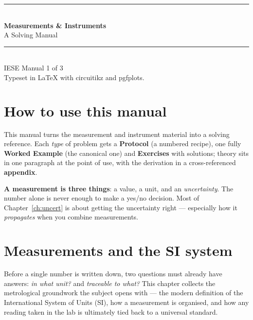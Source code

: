 \documentclass[11pt,a4paper,oneside]{book}
\begin{document}
\frontmatter

\begingroup
\thispagestyle{empty}\centering
\vspace*{2.2cm}
{\color{accent}\rule{\linewidth}{1.4pt}}\\[0.5cm]
{\Huge\bfseries\color{accent} Measurements \& Instruments}\\[0.35cm]
{\LARGE A Solving Manual}\\[0.4cm]
{\color{accent}\rule{\linewidth}{1.4pt}}\\[1.2cm]
{\large IESE Manual 1 of 3 }\\[1.6cm]
{\footnotesize Typeset in \LaTeX{} with circuitikz and pgfplots.}
\par\vspace*{\fill}
\endgroup
\clearpage

\chapter*{How to use this manual}

This manual turns the measurement and instrument material into a solving reference.
Each \emph{type} of problem gets a \textbf{Protocol} (a numbered recipe), one
fully \textbf{Worked Example} (the canonical one) and
\textbf{Exercises} with solutions; theory sits in one paragraph at the point of
use, with the derivation in a cross-referenced \textbf{appendix}.

\begin{keyidea}
\textbf{A measurement is three things}: a value, a unit, and an
\emph{uncertainty}. The number alone is never enough to make a yes/no decision.
Most of Chapter~\ref{ch:uncert} is about getting the uncertainty right ---
especially how it \emph{propagates} when you combine measurements.
\end{keyidea}

\tableofcontents
\clearpage
\mainmatter

\chapter{Measurements and the SI system}\label{ch:si}

Before a single number is written down, two questions must already have answers:
\emph{in what unit?} and \emph{traceable to what?} This chapter collects the
metrological groundwork the subject opens with --- the modern definition of the
International System of Units (SI), how a measurement is organised, and how any
reading taken in the lab is ultimately tied back to a universal standard.
\end{document}
